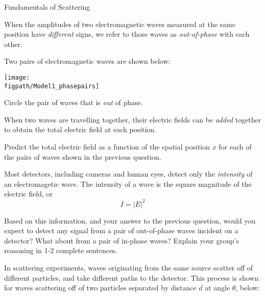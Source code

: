 \begin{activity}{Fundamentals of Scattering}
\begin{infobox}
	When the amplitudes of two electromagnetic waves measured at the same position have \emph{different} signs, we refer to those waves as \emph{out-of-phase} with each other.
\end{infobox}

\begin{ctqs}

	\question Two pairs of electromagnetic waves are shown below:
	
		\vspace{6pt}
		\centerline{\texttt{[image: \\figpath/Model1\_phasepairs]}}
		
		Circle the pair of waves that is \emph{out} of phase.
		
	\question When two waves are travelling together, their electric fields can be \emph{added} together to obtain the total electric field at each position.
	
		Predict the total electric field as a function of the spatial position $x$ for each of the pairs of waves shown in the previous question.
		
		\begin{solution}[1in]\end{solution}
		
	\question Most detectors, including cameras and human eyes, detect only the \emph{intensity} of an electromagetic wave.  The intensity of a wave is the square magnitude of the electric field, or
	\begin{equation*}
		I = |E|^2
	\end{equation*}
	
		Based on this information, and your answer to the previous question, would you expect to detect any signal from a pair of out-of-phase waves incident on a detector?  What about from a pair of in-phase waves?  Explain your group's reasoning in 1-2 complete sentences.

\end{ctqs}

\clearpage
\begin{model}
\label{\labelbase:mdl:twoparticlescattering}
	
	In scattering experiments, waves originating from the same source scatter off of different particles, and take different paths to the detector.  This process is shown for waves scattering off of two particles separated by distance $d$ at angle $\theta$, below:
	

\end{model}
\end{activity}
